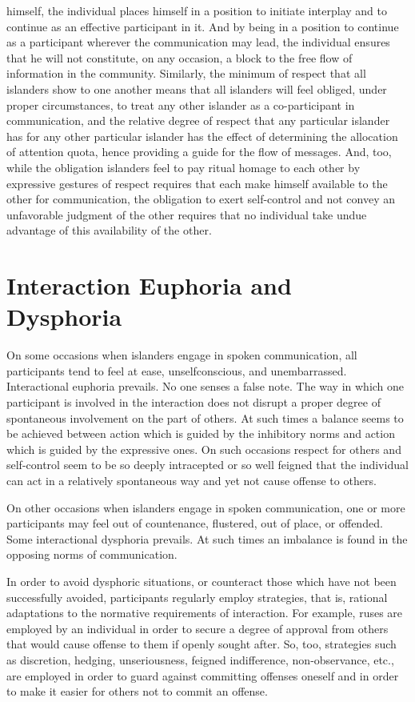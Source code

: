 \documentclass[openany,nobib]{tufte-book}
\begin{document}
himself, the individual places himself in a position to initiate
interplay and to continue as an effective participant in it. And by
being in a position to continue as a participant wherever the
communication may lead, the individual ensures that he will not
constitute, on any occasion, a block to the free flow of information in
the community. Similarly, the minimum of respect that all islanders show
to one another means that all islanders will feel obliged, under proper
circumstances, to treat any other islander as a co-participant in
communication, and the relative degree of respect that any particular
islander has for any other particular islander has the effect of
determining the allocation of attention quota, hence providing a guide
for the flow of messages. And, too, while the obligation islanders feel
to pay ritual homage to each other by expressive gestures of respect
requires that each make himself available to the other for
communication, the obligation to exert self-control and not convey an
unfavorable judgment of the other requires that no individual take undue
advantage of this availability of the other.

\hypertarget{interaction-euphoria-and-dysphoria}{%
\section{Interaction Euphoria and
Dysphoria}\label{interaction-euphoria-and-dysphoria}}

On some occasions when islanders engage in spoken communication, all
participants tend to feel at ease, unselfconscious, and unembarrassed.
Interactional euphoria prevails. No one senses a false note. The way in
which one participant is involved in the interaction does not disrupt a
proper degree of spontaneous involvement on the part of others. At such
times a balance seems to be achieved between action which is guided by
the inhibitory norms and action which is guided by the expressive ones.
On such occasions respect for others and self-control seem to be so
deeply intracepted or so well feigned that the individual can act in a
relatively spontaneous way and yet not cause offense to others.

On other occasions when islanders engage in spoken communication, one or
more participants may feel out of countenance, flustered, out of place,
or offended. Some interactional dysphoria prevails. At such times an
imbalance is found in the opposing norms of communication.

In order to avoid dysphoric situations, or counteract those which have
not been successfully avoided, participants regularly employ strategies,
that is, rational adaptations to the normative requirements of
interaction. For example, ruses are employed by an individual in order
to secure a degree of approval from others that would cause offense to
them if openly sought after. So, too, strategies such as discretion,
hedging, unseriousness, feigned indifference, non-observance, etc., are
employed in order to guard against committing offenses oneself and in
order to make it easier for others not to commit an offense.
\end{document}
